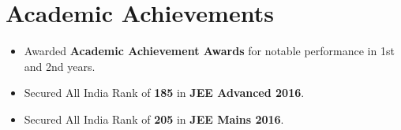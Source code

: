 \section*{Academic Achievements}
\begin{itemize}

\item Awarded \textbf{Academic Achievement Awards} for notable performance in 1st and 2nd years.
\item Secured All India Rank of {\bf 185} in {\bf JEE Advanced 2016}.
\item Secured All India Rank of {\bf 205} in {\bf JEE Mains 2016}.

\end{itemize}
